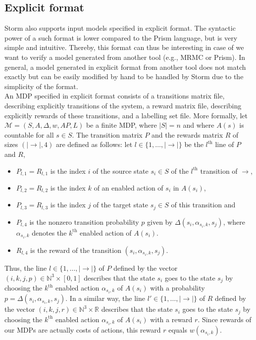 \subsection{Explicit format}
Storm also supports input models specified in explicit format. The syntactic power of a such format is lower compared to the Prism language, but is
very simple and intuitive. Thereby, this format can thus be interesting in case of
we want to verify a model generated from another tool (e.g., MRMC or Prism).
In general, a model generated in explicit format from another tool does not match exactly but can be easily modified by hand to be handled by Storm due to
the simplicity of the format. \\

An MDP specified in explicit format
consists of a transitions matrix file, describing explicitly transitions of the system, a reward matrix file, describing explicitly
rewards of these transitions, and a labelling set file. More formally, let $\mathcal{M} = (S, A, \Delta, w, AP, L)$ be a finite MDP, where $|S| = n$ and where $A(s)$ is countable for all $s \in S$. The transition matrix $P$ and the rewards matrix $R$ of sizes $(|\rightarrow|, 4)$ are defined as follows:
let $l \in \{1, \dots, |\rightarrow|\}$ be the $l^\text{th}$ line of $P$ and $R$,
\begin{itemize}
  \item $P_{l, 1} = R_{l, 1}$ is the index $i$ of the source state $s_i \in S$ of the $l^\text{th}$ transition of $\rightarrow$,
  \item $P_{l, 2} = R_{l, 2}$ is the index $k$ of an enabled action of $s_i$ in $A(s_i)$,
  \item $P_{l, 3} = R_{l, 3}$ is the index $j$ of the target state $s_j \in S$ of this transition and
  \item $P_{l, 4}$ is the nonzero transition probability $p$ given by $\Delta(s_i, \alpha_{s_i, k}, s_j)$, where $\alpha_{s_i, k}$ denotes the $k^\text{th}$ enabled action of $A(s_i)$.
  \item $R_{l, 4}$ is the reward of the transition $(s_i, \alpha_{s_i, k}, s_j)$.
\end{itemize}
Thus, the line $l \in \{1, \dots, |\rightarrow|\}$ of $P$ defined by the vector $(i, k, j, p) \in \mathbb{N}^3
\times [0, 1]$ describes that the state $s_i$ goes to the state $s_j$ by choosing
the $k^\text{th}$ enabled action $\alpha_{s_i, k}$ of $A(s_i)$ with a probability $p = \Delta(s_i, \alpha_{s_i, k}, s_j)$. In a similar way,
the line $l' \in \{1, \dots, |\rightarrow|\}$ of $R$ defined by the vector
$(i, k, j, r) \in \mathbb{N}^3 \times \mathbb{R}$ describes that the state $s_i$ goes to the state $s_j$ by choosing the $k^\text{th}$ enabled action $\alpha_{s_i, k}$ of $A(s_i)$ with a reward $r$.
Since rewards of our MDPs are actually costs of actions, this reward $r$ equals $w(\alpha_{s_i, k})$. \\

